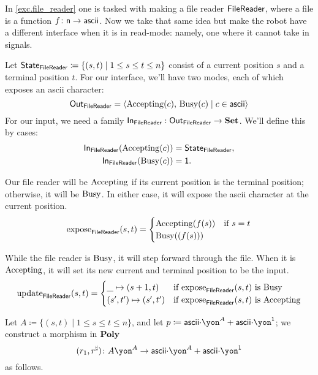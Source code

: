 \documentclass[Book-Poly]{subfiles}
\begin{document}
\begin{example}\label{ex.generalized_file_reader}
In \cref{exc.file_reader} one is tasked with making a file reader $\mathsf{FileReader}$, where a file is a function $f\colon\mathsf{n}\to\mathsf{ascii}$. Now we take that same idea but make the robot have a different interface when it is in read-mode: namely, one where it cannot take in signals.

Let $\mathsf{State}_{\mathsf{FileReader}} \coloneqq \{(s,t)\mid 1\leq s\leq t\leq n\}$ consist of a
current position $s$ and a terminal position $t$. For our interface, we'll have
two modes, each of which exposes an ascii character:
\[\mathsf{Out}_{\mathsf{FileReader}} = \langle \mathrm{Accepting}(c),\, \mathrm{Busy}(c) \mid c \in \mathsf{ascii} \rangle
\]
For our input, we need a family $\mathsf{In}_{\mathsf{FileReader}} : \mathsf{Out}_{\mathsf{FileReader}} \to \textbf{Set}$.
We'll define this by cases:
\begin{align*}
  \mathsf{In}_{\mathsf{FileReader}}(\mathrm{Accepting}(c)) &= \mathsf{State}_{\mathsf{FileReader}}, \\
  \mathsf{In}_{\mathsf{FileReader}}(\mathrm{Busy}(c)) &= \mathsf{1}.
\end{align*}

Our file reader will be $\mathrm{Accepting}$ if its current position is the
terminal position; otherwise, it will be $\mathrm{Busy}$. In either case, it will
expose the ascii character at the current position.
\begin{align*}
  \mathrm{expose}_{\mathsf{FileReader}}(s, t) = \begin{cases} \mathrm{Accepting}(f(s)) &\mbox{if $s = t$}\\ \mathrm{Busy}((f(s)))  \end{cases}
\end{align*}

While the file reader is $\mathrm{Busy}$, it will step forward through the file.
When it is $\mathrm{Accepting}$, it will set its new current and terminal position
to be the input. 
\begin{align*}
  \mathrm{update}_{\mathsf{FileReader}}(s, t) = \begin{cases} \_ \mapsto (s + 1, t) &\mbox{if $\mathrm{expose}_{\mathsf{FileReader}}(s, t)$ is $\mathrm{Busy}$} \\ (s', t') \mapsto (s', t') &\mbox{if $\mathrm{expose}_{\mathsf{FileReader}}(s, t)$ is $\mathrm{Accepting}$}  \end{cases}
\end{align*}

Let $A\coloneqq\{(s,t)\mid 1\leq s\leq t\leq n\}$, and let $p\coloneqq \Set{ascii}\mdot\yon^A+\Set{ascii}\mdot\yon^\1$; we construct a morphism in $\textbf{Poly}$
\[
(r_1,r^\sharp)\colon A\yon^A\to \Set{ascii}\mdot\yon^A+\Set{ascii}\mdot\yon^\1
\]
as follows.


\end{example}
\end{document}
